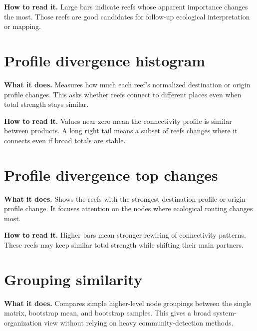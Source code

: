 \documentclass[11pt,a4paper]{article}
\begin{document}

\textbf{How to read it.} Large bars indicate reefs whose apparent importance changes the most.
Those reefs are good candidates for follow-up ecological interpretation or mapping.

\section{Profile divergence histogram}

\textbf{What it does.} Measures how much each reef's normalized destination or origin profile changes.
This asks whether reefs connect to different places even when total strength stays similar.


\textbf{How to read it.} Values near zero mean the connectivity profile is similar between products.
A long right tail means a subset of reefs changes where it connects even if broad totals are stable.

\section{Profile divergence top changes}

\textbf{What it does.} Shows the reefs with the strongest destination-profile or origin-profile change.
It focuses attention on the nodes where ecological routing changes most.


\textbf{How to read it.} Higher bars mean stronger rewiring of connectivity patterns.
These reefs may keep similar total strength while shifting their main partners.

\section{Grouping similarity}

\textbf{What it does.} Compares simple higher-level node groupings between the single matrix, bootstrap mean, and bootstrap samples.
This gives a broad system-organization view without relying on heavy community-detection methods.

\end{document}
